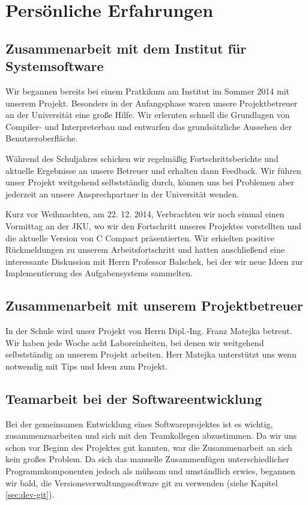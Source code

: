 

\chapter{Persönliche Erfahrungen}

\section{Zusammenarbeit mit dem Institut für\\ Systemsoftware}
\label{sec:coop-jku}
Wir begannen bereits bei einem Pratkikum am Institut im Sommer 2014 mit unserem Projekt. Besonders in der Anfangsphase waren unsere Projektbetreuer an der Universität eine große Hilfe. Wir erlernten schnell die Grundlagen von Compiler- und Interpreterbau und entwarfen das grundsätzliche Aussehen der Benutzeroberfläche.

Während des Schuljahres schicken wir regelmäßig Fortschrittsberichte und aktuelle Ergebnisse an unsere Betreuer und erhalten dann Feedback. Wir führen unser Projekt weitgehend selbstständig durch, können uns bei Problemen aber jederzeit an unsere Ansprechpartner in der Universität wenden.

Kurz vor Weihnachten, am 22. 12. 2014, Verbrachten wir noch einmal einen Vormittag an der JKU, wo wir den Fortschritt unseres Projektes vorstellten und die aktuelle Version von C Compact präsentierten. Wir erhielten positive Rückmeldungen zu unserem Arbeitsfortschritt und hatten anschließend eine interessante Diskussion mit Herrn Professor Balschek, bei der wir neue Ideen zur Implementierung des Aufgabensystems sammelten.

\section{Zusammenarbeit mit unserem Projektbetreuer}
In der Schule wird unser Projekt von Herrn Dipl.-Ing. Franz Matejka betreut. Wir haben jede Woche acht Laboreinheiten, bei denen wir weitgehend selbstständig an unserem Projekt arbeiten. Herr Matejka unterstützt uns wenn notwendig mit Tips und Ideen zum Projekt.

\section{Teamarbeit bei der Softwareentwicklung}
Bei der gemeinsamen Entwicklung eines Softwareprojektes ist es wichtig, zusammenzuarbeiten und sich mit den Teamkollegen abzustimmen. Da wir uns schon vor Beginn des Projektes gut kannten, war die Zusammenarbeit an sich kein großes Problem. Da sich das manuelle Zusammenfügen unterschiedlicher Programmkomponenten jedoch als mühsam und umständlich erwies, begannen wir bald, die Versionsverwaltungssoftware git zu verwenden (siehe Kapitel \ref{sec:dev-git}).


